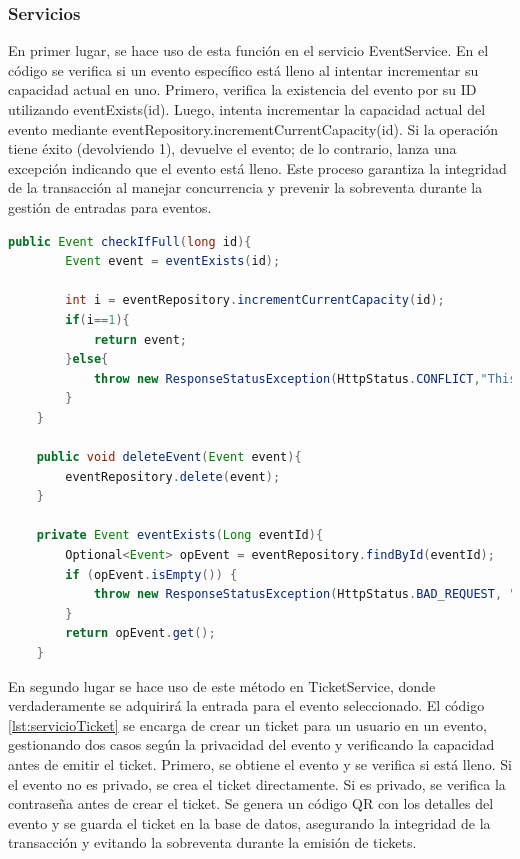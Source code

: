 \subsubsection*{Servicios}
En primer lugar, se hace uso de esta función en el servicio EventService. En el código se verifica si un evento específico está lleno al intentar incrementar su capacidad 
actual en uno. Primero, verifica la existencia del evento por su ID utilizando eventExists(id). Luego, intenta incrementar la capacidad actual del evento mediante 
eventRepository.incrementCurrentCapacity(id). Si la operación tiene éxito (devolviendo 1), devuelve el evento; de lo contrario, lanza una excepción indicando que el 
evento está lleno. Este proceso garantiza la integridad de la transacción al manejar concurrencia y prevenir la sobreventa durante la gestión de entradas para eventos.
\myjavastyle
\begin{lstlisting}[language=Java, caption=Función incrementCurrentCapacity, label=lst:servicioEvento] 
    public Event checkIfFull(long id){
        Event event = eventExists(id);

        int i = eventRepository.incrementCurrentCapacity(id);
        if(i==1){
            return event;
        }else{
            throw new ResponseStatusException(HttpStatus.CONFLICT,"This event is full");
        }
    }

    public void deleteEvent(Event event){
        eventRepository.delete(event);
    }

    private Event eventExists(Long eventId){
        Optional<Event> opEvent = eventRepository.findById(eventId);
        if (opEvent.isEmpty()) {
            throw new ResponseStatusException(HttpStatus.BAD_REQUEST, "Event not longer exist");
        }
        return opEvent.get();
    }
\end{lstlisting}
En segundo lugar se hace uso de este método en TicketService, donde verdaderamente se adquirirá la entrada para el evento seleccionado. El código \ref{lst:servicioTicket} se encarga de crear un ticket
para un usuario en un evento, gestionando dos casos según la privacidad del evento y verificando la capacidad antes de emitir el ticket. Primero, se obtiene el evento y se
verifica si está lleno. Si el evento no es privado, se crea el ticket directamente. Si es privado, se verifica la contraseña antes de crear el ticket. Se genera un código QR
con los detalles del evento y se guarda el ticket en la base de datos, asegurando la integridad de la transacción y evitando la sobreventa durante la emisión de tickets.
\myjavastyle
